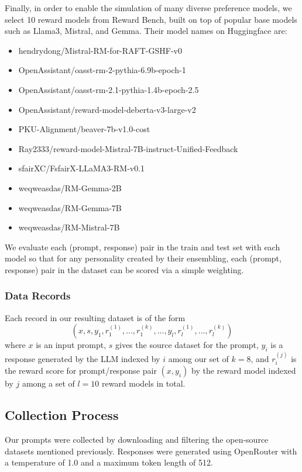 Finally, in order to enable the simulation of many diverse preference models, we select 10 reward models from Reward Bench, built on top of popular base models such as Llama3, Mistral, and Gemma.  Their model names on Huggingface are:  

\begin{itemize}
    \item hendrydong/Mistral-RM-for-RAFT-GSHF-v0 
    \item OpenAssistant/oasst-rm-2-pythia-6.9b-epoch-1
    \item OpenAssistant/oasst-rm-2.1-pythia-1.4b-epoch-2.5
    \item OpenAssistant/reward-model-deberta-v3-large-v2
    \item PKU-Alignment/beaver-7b-v1.0-cost 
    \item Ray2333/reward-model-Mistral-7B-instruct-Unified-Feedback
    \item sfairXC/FsfairX-LLaMA3-RM-v0.1
    \item weqweasdas/RM-Gemma-2B 
    \item weqweasdas/RM-Gemma-7B 
    \item weqweasdas/RM-Mistral-7B 
\end{itemize}

We evaluate each (prompt, response) pair in the train and test set with each model so that for any personality created by their ensembling, each (prompt, response) pair in the dataset can be scored via a simple weighting.

\subsubsection{Data Records}

Each record in our resulting dataset is of the form
$$ (x,s,y_1,r_1^{(1)},...,r_1^{(k)},...,y_l,r_l^{(1)},...,r_l^{(k)}) $$
where $x$ is an input prompt, $s$ gives the source dataset for the prompt, $y_i$ is a response generated by the LLM indexed by $i$ among our set of $k=8$, and $r_i^{(j)}$ is the reward score for prompt/response pair $(x, y_i)$ by the reward model indexed by $j$ among a set of $l=10$ reward models in total.


\subsection{Collection Process}

Our prompts were collected by downloading and filtering the open-source datasets mentioned previously.  Responses were generated using OpenRouter with a temperature of 1.0 and a maximum token length of 512.

